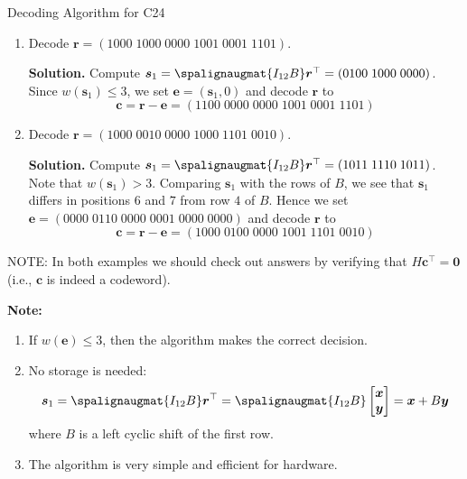 \begin{Example}{Decoding Algorithm for C24}{}
    \begin{enumerate}
        \item Decode $ \bm{r}=(1000\; 1000\; 0000\; 1001\; 0001\; 1101) $.

              \textbf{Solution.} Compute $ \bm{s}_1=\spalignaugmat{I_{12} B}\bm{r}^\top=
                  (0100\; 1000\; 0000) $. Since $ w(\bm{s}_1)\leqslant 3 $, we set
              $ \bm{e}=(\bm{s}_1,0) $ and decode $ \bm{r} $ to
              \[ \bm{c}=\bm{r}-\bm{e}=(1100\; 0000\; 0000\; 1001\; 0001\; 1101) \]

        \item Decode $ \bm{r}=(1000\; 0010\; 0000\; 1000\; 1101\; 0010) $.

              \textbf{Solution.} Compute $ \bm{s}_1=\spalignaugmat{I_{12} B}\bm{r}^\top=
                  (1011\; 1110\; 1011) $. Note that $ w(\bm{s}_1)>3 $. Comparing $ \bm{s}_1 $
              with the rows of $ B $, we see that $ \bm{s}_1 $ differs in positions $ 6 $
              and $ 7 $ from row $ 4 $ of $ B $. Hence we set $ \bm{e}=(0000\; 0110\; 0000\; 0001\; 0000\; 0000) $
              and decode $ \bm{r} $ to
              \[ \bm{c}=\bm{r}-\bm{e}=(1000\; 0100\; 0000\; 1001\; 1101\; 0010) \]
    \end{enumerate}

    NOTE\@: In both examples we should check out answers by verifying that $ H\bm{c}^\top=\bm{0} $
    (i.e., $ \bm{c} $ is indeed a codeword).
\end{Example}


\textbf{Note:}
\begin{enumerate}[label=(\arabic*)]
    \item If $ w(\bm{e})\leqslant 3 $, then the algorithm makes the correct decision.
    \item No storage is needed:
          \[ \bm{s}_1=\spalignaugmat{I_{12} B}\bm{r}^\top=\spalignaugmat{I_{12} B}
              \begin{bmatrix}
                  \bm{x} \\
                  \bm{y}
              \end{bmatrix}=\bm{x}+B\bm{y} \]
          where $ B $ is a left cyclic shift of the first row.
    \item The algorithm is very simple and efficient for hardware.
\end{enumerate}

